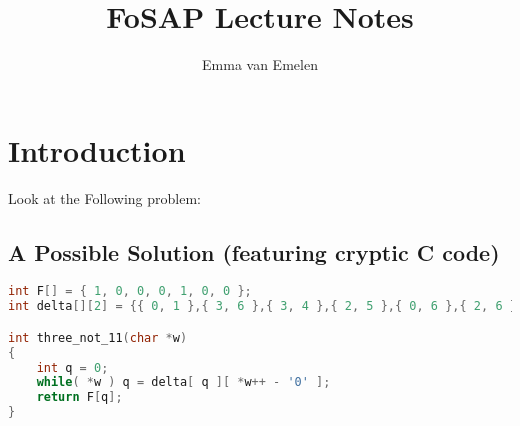 \documentclass[a4paper, 11pt]{article}
\author{Emma van Emelen}
\title{FoSAP Lecture Notes}
\begin{document}
    \maketitle
    \newpage

    \tableofcontents
    \newpage

    \section{Introduction}
    Look at the Following problem:\\
    \subsection{A Possible Solution (featuring cryptic C code)}
    \begin{lstlisting}[language=C]
int F[] = { 1, 0, 0, 0, 1, 0, 0 };
int delta[][2] = {{ 0, 1 },{ 3, 6 },{ 3, 4 },{ 2, 5 },{ 0, 6 },{ 2, 6 },{ 6, 6 }};

int three_not_11(char *w)
{
    int q = 0;
    while( *w ) q = delta[ q ][ *w++ - '0' ];
    return F[q];
}
    \end{lstlisting}
 
\end{document}
